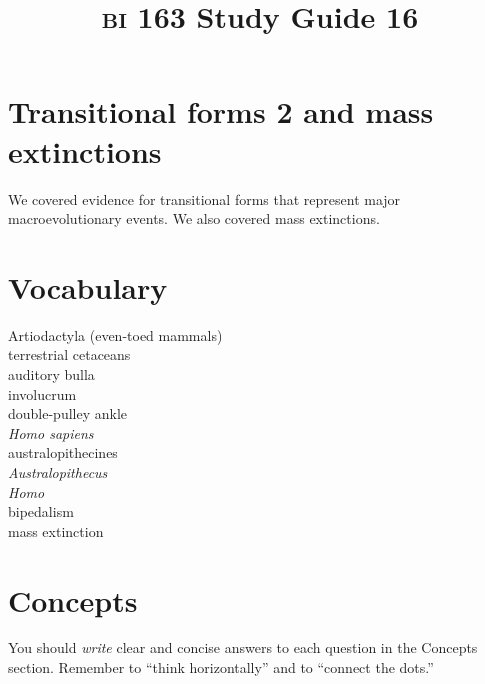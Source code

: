 \documentclass[letterpaper]{tufte-handout}
\title{{\scshape bi} 163 Study Guide 16}
\date{} %
\begin{document}
\maketitle	%

\section*{Transitional forms 2 and mass extinctions}

We covered evidence for transitional forms that represent major macroevolutionary events. We also covered mass extinctions.

\section*{Vocabulary}

\vspace{-1\baselineskip}
\begin{multicols}{2}
Artiodactyla (even-toed mammals) \\
terrestrial cetaceans \\
auditory bulla \\
involucrum \\
double-pulley ankle \\
\textit{Homo sapiens} \\
australopithecines \\
\textit{Australopithecus} \\
\textit{Homo} \\
bipedalism \\
mass extinction \\
\end{multicols}

\section*{Concepts}

You should \emph{write} clear and concise answers to each question in the Concepts section.  Remember to ``think horizontally'' and to ``connect the dots.'' \vspace*{\baselineskip}
\end{document}
